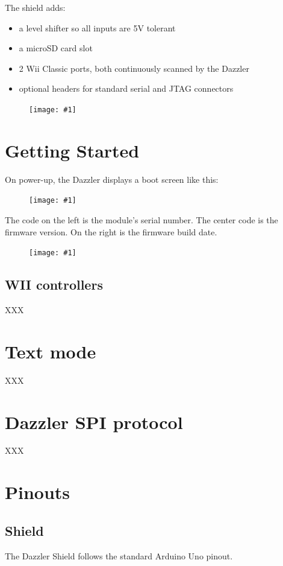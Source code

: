 \documentclass{article}
\newcommand{\dev}{Dazzler}
\newcommand{\png}[1]{
\begin{figure}[H]
\begin{center}
\texttt{[image: \#1]}
\end{center}
\end{figure}
}
\newcommand{\pngw}[2]{
\begin{figure}[H]
\begin{center}
\texttt{[image: \#1]}
\end{center}
\end{figure}
}
\begin{document}
\noindent
The shield adds:
\begin{itemize}
\item a level shifter so all inputs are 5V tolerant
\item a microSD card slot
\item 2 Wii Classic ports, both continuously scanned by the Dazzler
\item optional headers for standard serial and JTAG connectors
\end{itemize}

\png{img/gameduino-3x-dazzler/rot-0182}

\newpage
\section{Getting Started}

On power-up, the \dev{} displays a boot screen like this:

\pngw{img/gameduino-3x-dazzler/boot}{1.0}

The code on the left is the module's serial number. 
The center code is the firmware version. 
On the right is the firmware build date.

\pngw{img/gameduino-3x-dazzler/helloworld}{1.0}

\subsection{WII controllers}

XXX

\newpage
\section{Text mode}

XXX

\section{Dazzler SPI protocol}

XXX

\newpage
\section{Pinouts}

\newcommand{\activelow}[1]{$\overline{\mbox{#1}}$}

\subsection{Shield}
The Dazzler Shield follows the standard Arduino Uno pinout.
\end{document}
